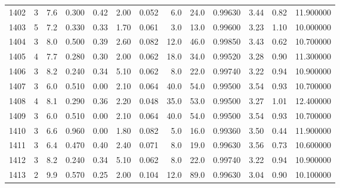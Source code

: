 \begin{tabular}{lrrrrrrrrrrrr}
1402 &        3 &            7.6 &             0.300 &         0.42 &            2.00 &      0.052 &                  6.0 &                  24.0 &  0.99630 &  3.44 &       0.82 &  11.900000 \\
1403 &        5 &            7.2 &             0.330 &         0.33 &            1.70 &      0.061 &                  3.0 &                  13.0 &  0.99600 &  3.23 &       1.10 &  10.000000 \\
1404 &        3 &            8.0 &             0.500 &         0.39 &            2.60 &      0.082 &                 12.0 &                  46.0 &  0.99850 &  3.43 &       0.62 &  10.700000 \\
1405 &        4 &            7.7 &             0.280 &         0.30 &            2.00 &      0.062 &                 18.0 &                  34.0 &  0.99520 &  3.28 &       0.90 &  11.300000 \\
1406 &        3 &            8.2 &             0.240 &         0.34 &            5.10 &      0.062 &                  8.0 &                  22.0 &  0.99740 &  3.22 &       0.94 &  10.900000 \\
1407 &        3 &            6.0 &             0.510 &         0.00 &            2.10 &      0.064 &                 40.0 &                  54.0 &  0.99500 &  3.54 &       0.93 &  10.700000 \\
1408 &        4 &            8.1 &             0.290 &         0.36 &            2.20 &      0.048 &                 35.0 &                  53.0 &  0.99500 &  3.27 &       1.01 &  12.400000 \\
1409 &        3 &            6.0 &             0.510 &         0.00 &            2.10 &      0.064 &                 40.0 &                  54.0 &  0.99500 &  3.54 &       0.93 &  10.700000 \\
1410 &        3 &            6.6 &             0.960 &         0.00 &            1.80 &      0.082 &                  5.0 &                  16.0 &  0.99360 &  3.50 &       0.44 &  11.900000 \\
1411 &        3 &            6.4 &             0.470 &         0.40 &            2.40 &      0.071 &                  8.0 &                  19.0 &  0.99630 &  3.56 &       0.73 &  10.600000 \\
1412 &        3 &            8.2 &             0.240 &         0.34 &            5.10 &      0.062 &                  8.0 &                  22.0 &  0.99740 &  3.22 &       0.94 &  10.900000 \\
1413 &        2 &            9.9 &             0.570 &         0.25 &            2.00 &      0.104 &                 12.0 &                  89.0 &  0.99630 &  3.04 &       0.90 &  10.100000 \\

\end{tabular}
